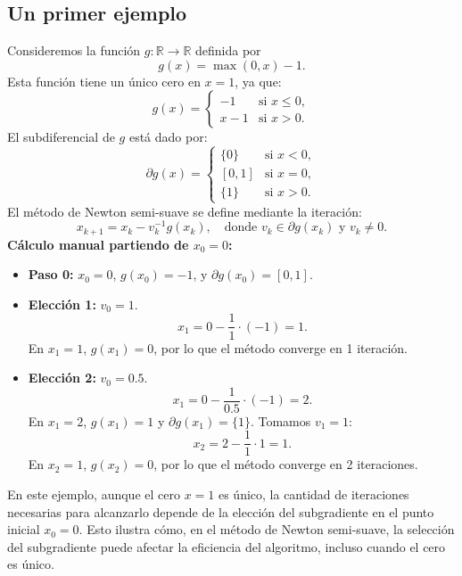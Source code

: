 \documentclass[12pt]{book}
\theoremstyle{definition}
\theoremstyle{plain}
\theoremstyle{remark}
\begin{document}
\subsection{Un primer ejemplo}

Consideremos la función \( g: \mathbb{R} \to \mathbb{R} \) definida por
\[
g(x) = \max(0, x) - 1.
\]
Esta función tiene un único cero en \( x = 1 \), ya que:
\[
g(x) =
\begin{cases}
-1 & \text{si } x \leq 0, \\
x - 1 & \text{si } x > 0.
\end{cases}
\]
El subdiferencial de \( g \) está dado por:
\[
\partial g(x) =
\begin{cases}
\{0\} & \text{si } x < 0, \\
[0, 1] & \text{si } x = 0, \\
\{1\} & \text{si } x > 0.
\end{cases}
\]
El método de Newton semi-suave se define mediante la iteración:
\[
x_{k+1} = x_k - v_k^{-1} g(x_k), \quad \text{donde } v_k \in \partial g(x_k) \text{ y } v_k \neq 0.
\]
\textbf{Cálculo manual partiendo de \( x_0 = 0 \):}
\begin{itemize}
    \item \textbf{Paso 0:} \( x_0 = 0 \), \( g(x_0) = -1 \), y \( \partial g(x_0) = [0, 1] \).

    \item \textbf{Elección 1:} \( v_0 = 1 \).
    \[
    x_1 = 0 - \frac{1}{1} \cdot (-1) = 1.
    \]
    En \( x_1 = 1 \), \( g(x_1) = 0 \), por lo que el método converge en 1 iteración.

    \item \textbf{Elección 2:} \( v_0 = 0.5 \).
    \[
    x_1 = 0 - \frac{1}{0.5} \cdot (-1) = 2.
    \]
    En \( x_1 = 2 \), \( g(x_1) = 1 \) y \( \partial g(x_1) = \{1\} \). Tomamos \( v_1 = 1 \):
    \[
    x_2 = 2 - \frac{1}{1} \cdot 1 = 1.
    \]
    En \( x_2 = 1 \), \( g(x_2) = 0 \), por lo que el método converge en 2 iteraciones.
\end{itemize}

En este ejemplo, aunque el cero \( x = 1 \) es único, la cantidad de iteraciones necesarias para alcanzarlo depende de la elección del subgradiente en el punto inicial \( x_0 = 0 \). Esto ilustra cómo, en el método de Newton semi-suave, la selección del subgradiente puede afectar la eficiencia del algoritmo, incluso cuando el cero es único.
\end{document}
